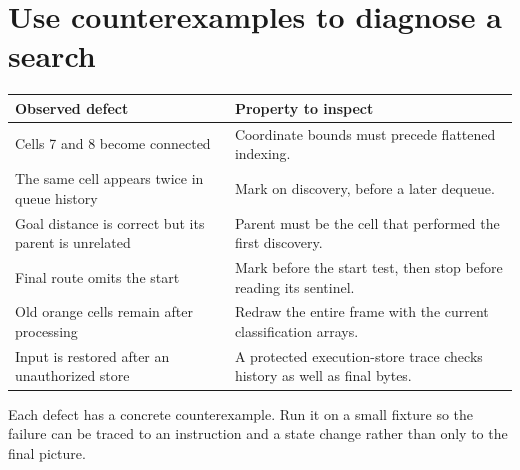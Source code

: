 \section{Use counterexamples to diagnose a search}\label{maze-x-failures}
\begin{longtable}{@{}p{50mm}p{108mm}@{}}
  \toprule
  Observed defect                                      & Property to inspect                                                      \\\midrule\endhead
  Cells 7 and 8 become connected                       & Coordinate bounds must precede flattened indexing.                       \\
  The same cell appears twice in queue history         & Mark on discovery, before a later dequeue.                               \\
  Goal distance is correct but its parent is unrelated & Parent must be the cell that performed the first discovery.              \\
  Final route omits the start                          & Mark before the start test, then stop before reading its sentinel.       \\
  Old orange cells remain after processing             & Redraw the entire frame with the current classification arrays.          \\
  Input is restored after an unauthorized store        & A protected execution-store trace checks history as well as final bytes. \\
  \bottomrule
\end{longtable}
Each defect has a concrete counterexample. Run it on a small fixture so the failure
can be traced to an instruction and a state change rather than only to the final picture.
